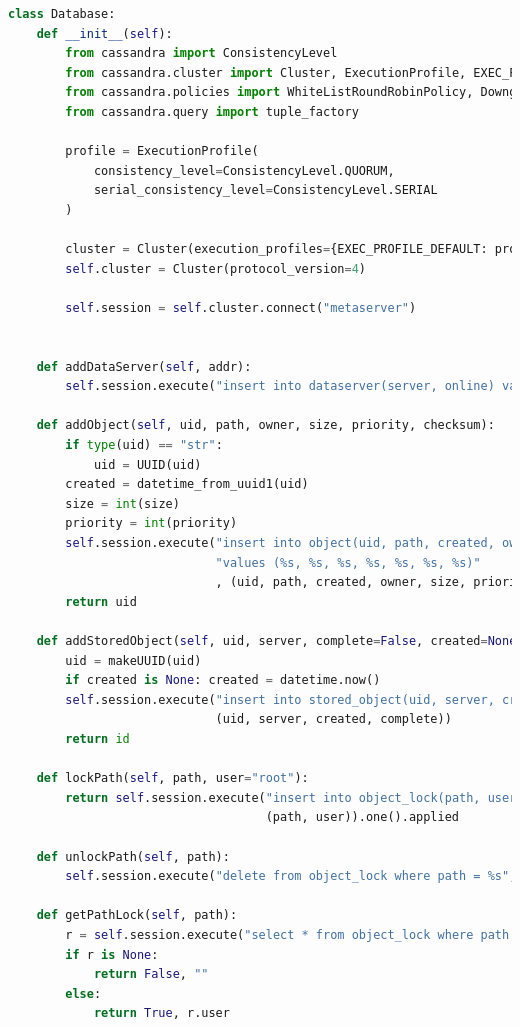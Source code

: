 \documentclass[11pt,a4paper,english]{article}
\begin{document}
\begin{lstlisting}[language=Python, title=Codice]
class Database:
    def __init__(self):
        from cassandra import ConsistencyLevel
        from cassandra.cluster import Cluster, ExecutionProfile, EXEC_PROFILE_DEFAULT
        from cassandra.policies import WhiteListRoundRobinPolicy, DowngradingConsistencyRetryPolicy
        from cassandra.query import tuple_factory

        profile = ExecutionProfile(
            consistency_level=ConsistencyLevel.QUORUM,
            serial_consistency_level=ConsistencyLevel.SERIAL
        )

        cluster = Cluster(execution_profiles={EXEC_PROFILE_DEFAULT: profile})
        self.cluster = Cluster(protocol_version=4)

        self.session = self.cluster.connect("metaserver")


    def addDataServer(self, addr):
        self.session.execute("insert into dataserver(server, online) values (%s, false)", (addr, ))

    def addObject(self, uid, path, owner, size, priority, checksum):
        if type(uid) == "str":
            uid = UUID(uid)
        created = datetime_from_uuid1(uid)
        size = int(size)
        priority = int(priority)
        self.session.execute("insert into object(uid, path, created, owner, size, priority, checksum) "
                             "values (%s, %s, %s, %s, %s, %s, %s)"
                             , (uid, path, created, owner, size, priority, checksum))
        return uid

    def addStoredObject(self, uid, server, complete=False, created=None):
        uid = makeUUID(uid)
        if created is None: created = datetime.now()
        self.session.execute("insert into stored_object(uid, server, created, complete) values (%s, %s, %s, %s)",
                             (uid, server, created, complete))
        return id

    def lockPath(self, path, user="root"):
        return self.session.execute("insert into object_lock(path, user) values (%s, %s) if not exists",
                                    (path, user)).one().applied

    def unlockPath(self, path):
        self.session.execute("delete from object_lock where path = %s", (path, ))

    def getPathLock(self, path):
        r = self.session.execute("select * from object_lock where path = %s", (path, )).one()
        if r is None:
            return False, ""
        else:
            return True, r.user


\end{lstlisting}
\end{document}
